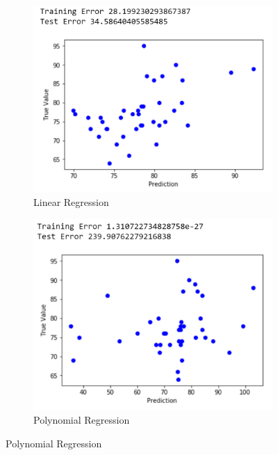 \documentclass{article}
\begin{document}
\begin{figure}[h]
\begin{subfigure}{0.5\textwidth}
\includegraphics[width=0.9\linewidth]{nbalinreg.png} 
\caption{Linear Regression}
\end{subfigure}
\begin{subfigure}{0.5\textwidth}
\includegraphics[width=0.9\linewidth]{nbapolyreg.png}
\caption{Polynomial Regression}
\end{subfigure}
\end{figure}
\end{document}
